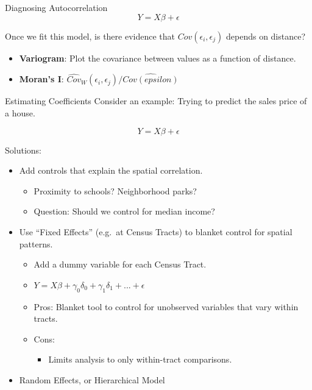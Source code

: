 \documentclass[
  8pt,
  ignorenonframetext,
]{beamer}
\providecommand{\tightlist}{%
  \setlength{\itemsep}{0pt}\setlength{\parskip}{0pt}}
\begin{document}
\begin{frame}{Diagnosing Autocorrelation}
\protect\hypertarget{diagnosing-autocorrelation}{}
\[Y = X\beta + \epsilon\]

Once we fit this model, is there evidence that
\(Cov(\epsilon_i, \epsilon_j)\) depends on distance?

\begin{itemize}
\item
  \textbf{Variogram}: Plot the covariance between values as a function
  of distance.
\item
  \textbf{Moran's I}:
  \(\hat{Cov}_W(\epsilon_i, \epsilon_j) / \hat{Cov(epsilon)}\)
\end{itemize}
\end{frame}

\begin{frame}[fragile]{Estimating Coefficients}
\protect\hypertarget{estimating-coefficients-1}{}
Consider an example: Trying to predict the sales price of a house.

\[Y = X\beta + \epsilon\]

Solutions:

\begin{itemize}
\tightlist
\item
  Add controls that explain the spatial correlation.

  \begin{itemize}
  \tightlist
  \item
    Proximity to schools? Neighborhood parks?
  \item
    Question: Should we control for median income? \pause
  \end{itemize}
\item
  Use ``Fixed Effects'' (e.g.~at Census Tracts) to blanket control for
  spatial patterns.

  \begin{itemize}
  \tightlist
  \item
    Add a dummy variable for each Census Tract.
  \item
    \(Y = X\beta + \gamma_0 \delta_0 + \gamma_1 \delta_1 + ... + \epsilon\)
  \item
    Pros: Blanket tool to control for unobserved variables that vary
    within tracts.
  \item
    Cons:

    \begin{itemize}
    \tightlist
    \item
      Limits analysis to only within-tract comparisons. \pause
    \end{itemize}
  \end{itemize}
\item
  Random Effects, or Hierarchical Model


\end{itemize}
\end{frame}
\end{document}

